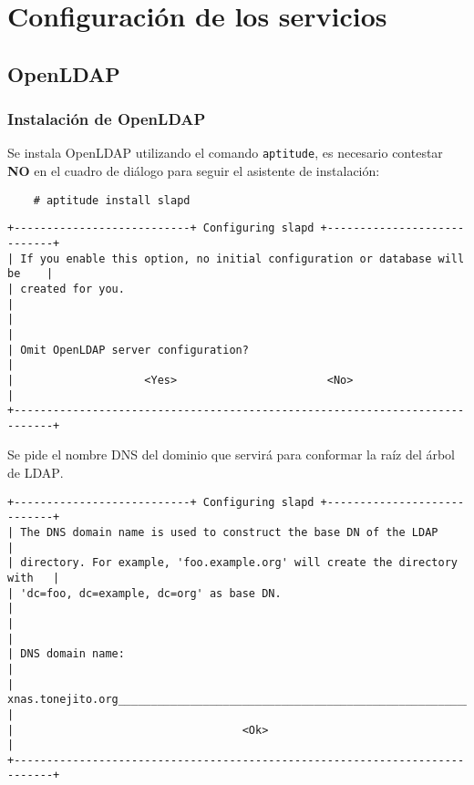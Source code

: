     \section {Configuraci\'{o}n de los servicios}

      \subsection {\textup{OpenLDAP}}

          \subsubsection {Instalaci\'{o}n de \textup{OpenLDAP}}

Se instala \textup{OpenLDAP} utilizando el comando \texttt{aptitude}, es necesario contestar \textbf{NO} en el cuadro de di\'{a}logo para seguir el asistente de instalaci\'{o}n:

{
\scriptsize
\linespread{1}
\begin{verbatim}
    # aptitude install slapd
\end{verbatim}
}


{
\scriptsize
\linespread{1}
\begin{verbatim}
+---------------------------+ Configuring slapd +----------------------------+
| If you enable this option, no initial configuration or database will be    |
| created for you.                                                           |
|                                                                            |
| Omit OpenLDAP server configuration?                                        |
|                    <Yes>                       <No>                        |
+----------------------------------------------------------------------------+
\end{verbatim}
}

Se pide el nombre \textsc{\gls{DNS}} del dominio que servir\'{a} para conformar la ra\'{i}z del \'{a}rbol de \textsc{\gls{LDAP}}.

{
\scriptsize
\linespread{1}
\begin{verbatim}
+---------------------------+ Configuring slapd +----------------------------+
| The DNS domain name is used to construct the base DN of the LDAP           |
| directory. For example, 'foo.example.org' will create the directory with   |
| 'dc=foo, dc=example, dc=org' as base DN.                                   |
|                                                                            |
| DNS domain name:                                                           |
| xnas.tonejito.org_________________________________________________________ |
|                                   <Ok>                                     |
+----------------------------------------------------------------------------+
\end{verbatim}
}

